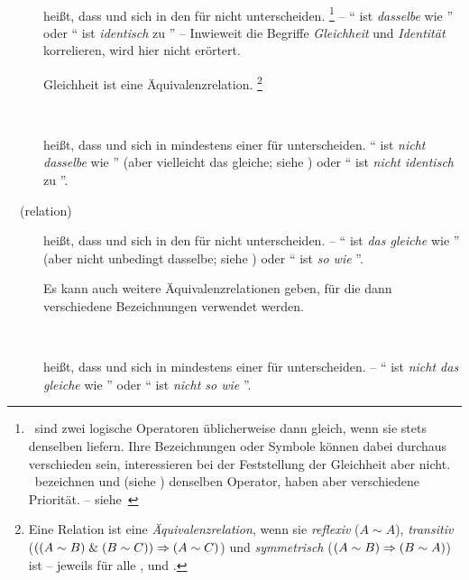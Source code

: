 \begin{description}
	\item[~~\emph{}]\label{def:Gleichheit}
	 heißt, dass  und  sich in den  für \objqt{=} nicht unterscheiden.%
	\footnote{%
		\textZB\ sind zwei logische Operatoren üblicherweise dann gleich, wenn sie stets denselben \emph{} liefern.
		Ihre Bezeichnungen oder Symbole können dabei durchaus verschieden sein, interessieren bei der Feststellung der Gleichheit aber nicht.
		\textZB\ bezeichnen \symqt{\metaandsym} und \symqt{\srand} (siehe ) denselben Operator, haben aber verschiedene Priorität. -- siehe~%
	}
	-- \enquote{ ist \emph{dasselbe} wie } oder \enquote{ ist \emph{identisch} zu }
	-- Inwieweit die Begriffe \emph{Gleichheit} und \emph{Identität} korrelieren, wird hier nicht erörtert.

	Gleichheit ist eine Äquivalenzrelation.%
	\footnote{%
		Eine Relation \objqt{\sim} ist eine \emph{Äquivalenzrelation}, wenn sie \emph{reflexiv} ($A \sim A$), \emph{transitiv} ($((A \sim B) \;\&\; (B \sim C)) \Rightarrow (A \sim C)$) und \emph{symmetrisch} ($(A \sim B) \Rightarrow (B \sim A)$) ist -- jeweils für alle ,  und .%
	}
	\item[~~\emph{}]\label{def:Ungleichheit}
	 heißt, dass  und  sich in mindestens einer  für \objqt{=} unterscheiden. \enquote{ ist \emph{nicht dasselbe} wie } (aber vielleicht das gleiche; siehe \objqt{\equiv}) oder \enquote{ ist \emph{nicht identisch} zu }.
	\item[~~\emph{}(relation)]\label{def:Äquivalenz}
	 heißt, dass  und  sich in den  für \objqt{\equiv} nicht unterscheiden.
	-- \enquote{ ist \emph{das gleiche} wie } (aber nicht unbedingt dasselbe; siehe \objqt{\eq}) oder \enquote{ ist \emph{so wie} }.

	Es kann auch weitere Äquivalenzrelationen geben, für die dann verschiedene Bezeichnungen verwendet werden.
	\item[~~\emph{}]\label{def:Kontravalenz}
	 heißt, dass  und  sich in mindestens einer  für \objqt{\nequiv} unterscheiden.
	-- \enquote{ ist \emph{nicht das gleiche} wie } oder \enquote{ ist \emph{nicht so wie} }.
\end{description}

